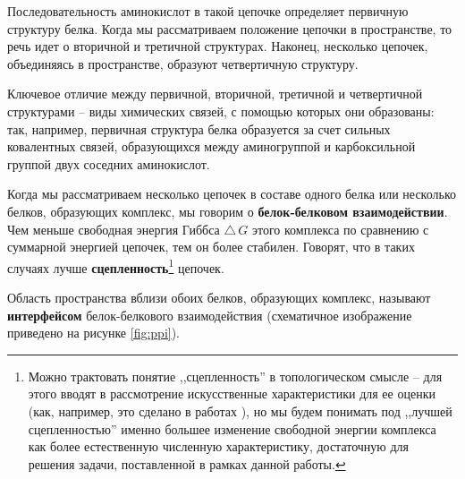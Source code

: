 Последовательность аминокислот в такой цепочке определяет первичную структуру белка. Когда мы рассматриваем положение цепочки в пространстве, то речь идет о вторичной и третичной структурах. Наконец, несколько цепочек, объединяясь в пространстве, образуют четвертичную структуру.

Ключевое отличие между первичной, вторичной, третичной и четвертичной структурами -- виды химических связей, с помощью которых они образованы: так, например, первичная структура белка образуется за  счет сильных ковалентных связей, образующихся между аминогруппой и карбоксильной группой двух соседних аминокислот.

\newpage
Когда мы рассматриваем несколько цепочек в составе одного белка или несколько белков, образующих комплекс, мы говорим о \textbf{белок-белковом взаимодействии}.
Чем меньше свободная энергия Гиббса $\triangle\,G$ этого комплекса по сравнению с суммарной энергией цепочек, тем он более стабилен. Говорят, что в таких случаях лучше \textbf{сцепленность}\footnote{Можно трактовать понятие ,,сцепленность'' в топологическом смысле -- для этого вводят в рассмотрение искусственные характеристики для ее оценки (как, например, это сделано в работах \cite{ialign, pcalign}), но мы будем понимать под ,,лучшей сцепленностью'' именно большее изменение  свободной энергии комплекса как более естественную численную характеристику, достаточную для решения задачи, поставленной в рамках данной работы. } цепочек. 





Область пространства вблизи обоих белков, образующих комплекс, называют \textbf{интерфейсом} белок-белкового взаимодействия (схематичное изображение приведено на рисунке \ref{fig:ppi}). 



